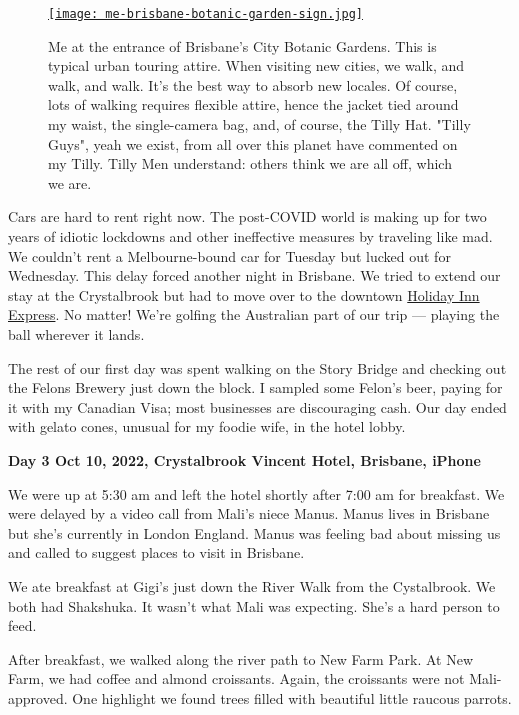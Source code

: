 \captionsetup[figure]{labelformat=empty}
\begin{SCfigure}
\centering
 \href{https://conceptcontrol.smugmug.com/Trips/Overseas/Australia-New-Zealand-2022/i-SpMnddW/A}{\texttt{[image: me-brisbane-botanic-garden-sign.jpg]}}
\caption[Me Brisbane's City Botanic Gardens]{Me at the entrance of Brisbane's City Botanic Gardens. This is
typical urban touring attire. When visiting new cities, we walk, and
walk, and walk. It's the best way to absorb new locales. Of course, lots
of walking requires flexible attire, hence the jacket tied around my
waist, the single-camera bag, and, of course, the Tilly Hat. "Tilly
Guys", yeah we exist, from all over this planet have commented on my
Tilly. Tilly Men understand: others think we are all off, which we are.}
\label{fig:7548x1}
\end{SCfigure}


Cars are hard to rent right now. The post-COVID world is making up for
two years of idiotic lockdowns and other ineffective measures by
traveling like mad. We couldn't rent a Melbourne-bound car for Tuesday
but lucked out for Wednesday. This delay forced another night in
Brisbane. We tried to extend our stay at the Crystalbrook but had to
move over to the downtown
\href{https://www.ihg.com/holidayinnexpress/hotels/us/en/brisbane/bneex/hoteldetail}{Holiday
Inn Express}. No matter! We're golfing the Australian part of our trip
--- playing the ball wherever it lands.

The rest of our first day was spent walking on the Story Bridge and
checking out the Felons Brewery just down the block. I sampled some
Felon's beer, paying for it with my Canadian Visa; most businesses are
discouraging cash. Our day ended with gelato cones, unusual for my
foodie wife, in the hotel lobby.


\textbf{Day 3 Oct 10, 2022, Crystalbrook Vincent Hotel, Brisbane, iPhone}

We were up at 5:30 am and left the hotel shortly after 7:00 am for
breakfast. We were delayed by a video call from Mali's niece Manus.
Manus lives in Brisbane but she's currently in London England. Manus was
feeling bad about missing us and called to suggest places to visit in
Brisbane.

We ate breakfast at Gigi's just down the River Walk from the
Cystalbrook. We both had Shakshuka. It wasn't what Mali was expecting.
She's a hard person to feed.

After breakfast, we walked along the river path to New Farm Park. At New
Farm, we had coffee and almond croissants. Again, the croissants were
not Mali-approved. One highlight we found trees filled with beautiful
little raucous parrots.

